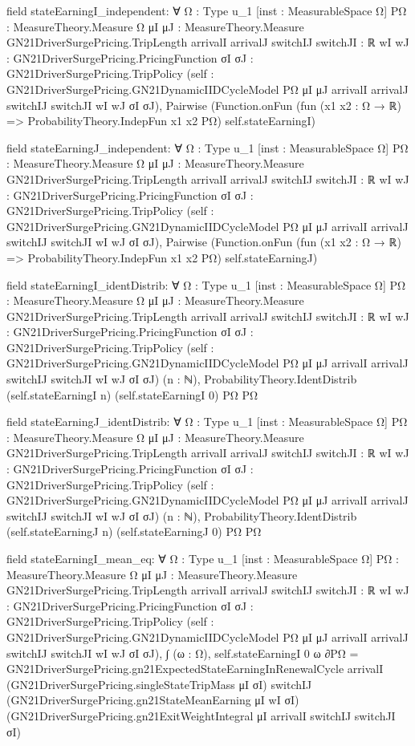 \documentclass[10pt]{article}
\begin{document}
\begin{ReviewVerbatim}
field stateEarningI_independent:
∀ {Ω : Type u_1} [inst : MeasurableSpace Ω] {PΩ : MeasureTheory.Measure Ω}
  {μI μJ : MeasureTheory.Measure GN21DriverSurgePricing.TripLength} {arrivalI arrivalJ switchIJ switchJI : ℝ}
  {wI wJ : GN21DriverSurgePricing.PricingFunction} {σI σJ : GN21DriverSurgePricing.TripPolicy}
  (self : GN21DriverSurgePricing.GN21DynamicIIDCycleModel PΩ μI μJ arrivalI arrivalJ switchIJ switchJI wI wJ σI σJ),
  Pairwise (Function.onFun (fun (x1 x2 : Ω → ℝ) => ProbabilityTheory.IndepFun x1 x2 PΩ) self.stateEarningI)

field stateEarningJ_independent:
∀ {Ω : Type u_1} [inst : MeasurableSpace Ω] {PΩ : MeasureTheory.Measure Ω}
  {μI μJ : MeasureTheory.Measure GN21DriverSurgePricing.TripLength} {arrivalI arrivalJ switchIJ switchJI : ℝ}
  {wI wJ : GN21DriverSurgePricing.PricingFunction} {σI σJ : GN21DriverSurgePricing.TripPolicy}
  (self : GN21DriverSurgePricing.GN21DynamicIIDCycleModel PΩ μI μJ arrivalI arrivalJ switchIJ switchJI wI wJ σI σJ),
  Pairwise (Function.onFun (fun (x1 x2 : Ω → ℝ) => ProbabilityTheory.IndepFun x1 x2 PΩ) self.stateEarningJ)

field stateEarningI_identDistrib:
∀ {Ω : Type u_1} [inst : MeasurableSpace Ω] {PΩ : MeasureTheory.Measure Ω}
  {μI μJ : MeasureTheory.Measure GN21DriverSurgePricing.TripLength} {arrivalI arrivalJ switchIJ switchJI : ℝ}
  {wI wJ : GN21DriverSurgePricing.PricingFunction} {σI σJ : GN21DriverSurgePricing.TripPolicy}
  (self : GN21DriverSurgePricing.GN21DynamicIIDCycleModel PΩ μI μJ arrivalI arrivalJ switchIJ switchJI wI wJ σI σJ)
  (n : ℕ), ProbabilityTheory.IdentDistrib (self.stateEarningI n) (self.stateEarningI 0) PΩ PΩ

field stateEarningJ_identDistrib:
∀ {Ω : Type u_1} [inst : MeasurableSpace Ω] {PΩ : MeasureTheory.Measure Ω}
  {μI μJ : MeasureTheory.Measure GN21DriverSurgePricing.TripLength} {arrivalI arrivalJ switchIJ switchJI : ℝ}
  {wI wJ : GN21DriverSurgePricing.PricingFunction} {σI σJ : GN21DriverSurgePricing.TripPolicy}
  (self : GN21DriverSurgePricing.GN21DynamicIIDCycleModel PΩ μI μJ arrivalI arrivalJ switchIJ switchJI wI wJ σI σJ)
  (n : ℕ), ProbabilityTheory.IdentDistrib (self.stateEarningJ n) (self.stateEarningJ 0) PΩ PΩ

field stateEarningI_mean_eq:
∀ {Ω : Type u_1} [inst : MeasurableSpace Ω] {PΩ : MeasureTheory.Measure Ω}
  {μI μJ : MeasureTheory.Measure GN21DriverSurgePricing.TripLength} {arrivalI arrivalJ switchIJ switchJI : ℝ}
  {wI wJ : GN21DriverSurgePricing.PricingFunction} {σI σJ : GN21DriverSurgePricing.TripPolicy}
  (self : GN21DriverSurgePricing.GN21DynamicIIDCycleModel PΩ μI μJ arrivalI arrivalJ switchIJ switchJI wI wJ σI σJ),
  ∫ (ω : Ω), self.stateEarningI 0 ω ∂PΩ =
    GN21DriverSurgePricing.gn21ExpectedStateEarningInRenewalCycle arrivalI
      (GN21DriverSurgePricing.singleStateTripMass μI σI) switchIJ (GN21DriverSurgePricing.gn21StateMeanEarning μI wI σI)
      (GN21DriverSurgePricing.gn21ExitWeightIntegral μI arrivalI switchIJ switchJI σI)


\end{ReviewVerbatim}
\end{document}
